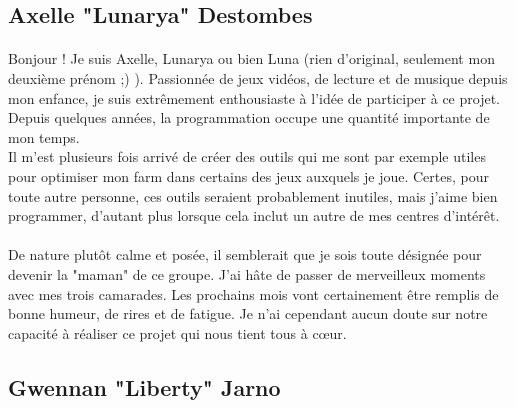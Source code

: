 \documentclass[12pt,a4paper]{article}
\begin{document}
\subsection{Axelle "Lunarya" Destombes}
\paragraph{}
Bonjour ! Je suis Axelle, Lunarya ou bien Luna (rien d'original, seulement mon deuxième prénom ;) ). Passionnée de jeux vidéos, de lecture et de musique depuis mon enfance, je suis extrêmement enthousiaste à l'idée de participer à ce projet. Depuis quelques années, la programmation occupe une quantité importante de mon temps. 
\\
Il m'est plusieurs fois arrivé de créer des outils qui me sont par exemple utiles pour optimiser mon farm dans certains des jeux auxquels je joue. Certes, pour toute autre personne, ces outils seraient probablement inutiles, mais j'aime bien programmer, d'autant plus lorsque cela inclut un autre de mes centres d'intérêt.
\\
\\
De nature plutôt calme et posée, il semblerait que je sois toute désignée pour devenir la "maman" de ce groupe. J'ai hâte de passer de merveilleux moments avec mes trois camarades. Les prochains mois vont certainement être remplis de bonne humeur, de rires et de fatigue. Je n'ai cependant aucun doute sur notre capacité à réaliser ce projet qui nous tient tous à cœur. 
\\


\subsection{Gwennan "Liberty" Jarno}
\end{document}
